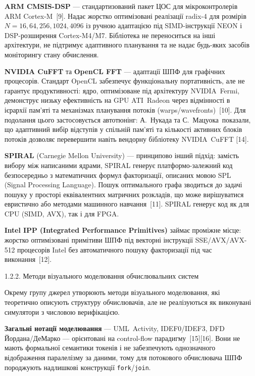 \textbf{ARM CMSIS-DSP} --- стандартизований пакет ЦОС для
мікроконтролерів ARM Cortex-M~{[}9{]}. Надає жорстко оптимізовані
реалізації radix-4 для розмірів \(N = 16,64,256,1024,4096\) із ручною
адаптацією під SIMD-інструкції NEON і DSP-розширення Cortex-M4/M7.
Бібліотека не переноситься на інші архітектури, не підтримує адаптивного
планування та не надає будь-яких засобів моніторингу стану обчислення.

\textbf{NVIDIA CuFFT} та \textbf{OpenCL FFT} --- адаптації ШПФ для
графічних процесорів. Стандарт OpenCL забезпечує функціональну
портативність, але не гарантує продуктивності: ядро, оптимізоване під
архітектуру NVIDIA~Fermi, демонструє низьку ефективність на GPU
ATI~Radeon через відмінності в ієрархії пам'яті та механізмах планування
потоків (warps/wavefronts)~{[}10{]}. Для подолання цього застосовується
автотюнінг: А.~Нукада та С.~Мацуока~показали, що адаптивний вибір
відступів у спільній пам'яті та кількості активних блоків потоків
дозволяє перевершити навіть вендорну бібліотеку NVIDIA~CuFFT {[}14{]}.

\textbf{SPIRAL} (Carnegie Mellon University) --- принципово інший
підхід: замість вибору між написаними ядрами, SPIRAL генерує
платформо-залежний код безпосередньо з математичних формул факторизації,
описаних мовою SPL (Signal Processing Language). Пошук оптимального
графа зводиться до задачі пошуку у просторі еквівалентних матричних
розкладів, що може вирішуватися евристично або методами машинного
навчання~{[}11{]}. SPIRAL генерує код як для CPU (SIMD, AVX), так і для
FPGA.

\textbf{Intel IPP (Integrated Performance Primitives)} займає проміжне
місце: жорстко оптимізовані примітиви ШПФ під векторні інструкції
SSE/AVX/AVX-512 процесорів Intel без автоматичного пошуку факторизації
під час виконання~{[}12{]}.

1.2.2. Методи візуального моделювання обчислювальних систем

Окрему групу джерел утворюють методи візуального моделювання, які
теоретично описують структуру обчислювачів, але не реалізуються як
виконувані симулятори з числовою верифікацією.

\textbf{Загальні нотації моделювання} --- UML~Activity, IDEF0/IDEF3, DFD
Йордана/ДеМарко --- орієнтовані на control-flow
парадигму~{[}15{]}{[}16{]}. Вони не мають формальної семантики токенів і
не забезпечують однозначного відображення паралелізму за даними, тому
для потокового обчислювача ШПФ породжують надлишкові конструкції
\texttt{fork}/\texttt{join}.

